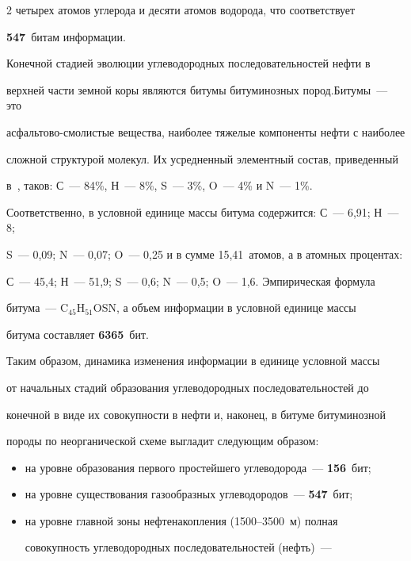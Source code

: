\begin{multicols}{2}
четырех атомов углерода и десяти атомов водорода, что соответствует 

\textbf{547}~битам информации.

     



     Конечной стадией эволюции углеводородных последовательностей нефти в 

верхней части земной коры являются битумы битуминозных пород.\linebreak Би\-тумы~--- это 

асфальтово-смолистые вещества, наиболее тяжелые компоненты нефти с наиболее 

сложной структурой молекул. Их усредненный элементный состав, приведенный 

в~\cite{16s}, таков: С~--- 84\%, Н~--- 8\%, S~--- 3\%, O~--- 4\% и N~--- 1\%. 

Соответственно, в условной единице массы битума содержится: С~--- 6,91; Н~--- 8; 

S~--- 0,09; N~--- 0,07; O~--- 0,25 и в сумме 15,41~атомов, а в атомных процентах: 

     С~--- 45,4; Н~--- 51,9; S~--- 0,6; N~--- 0,5; O~--- 1,6. Эмпирическая формула 

битума~--- C$_{45}$H$_{51}$OSN, а объем информации в условной единице массы 

битума составляет \textbf{6365}~бит. 

     

     Таким образом, динамика изменения информации в единице условной массы 

от начальных стадий образования углеводородных последовательностей до 

конечной в виде их совокупности в нефти и, наконец, в битуме битуминозной 

породы по неорганической схеме выгладит следующим образом:

     \begin{itemize}

\item на уровне образования первого простейшего углеводорода~--- \textbf{156}~бит; 

\item на уровне существования газообразных углеводородов~--- \textbf{547}~бит;

\item на уровне главной зоны нефтенакопления (1500--3500~м) полная 

совокупность углеводородных последовательностей (нефть)~--- 


\end{itemize}
\end{multicols}
